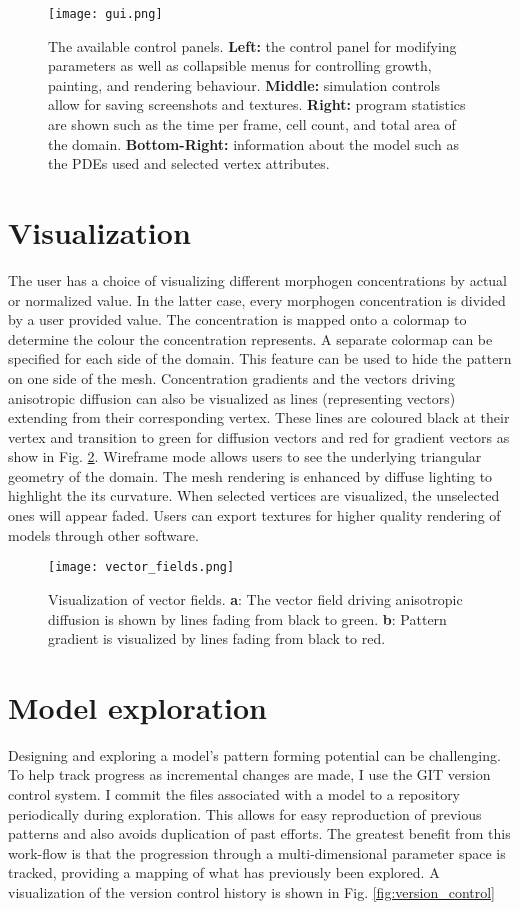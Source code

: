 \begin{figure}[p]
	\centering
	\texttt{[image: gui.png]}	
	\caption{The available control panels. \textbf{Left:} the control panel for modifying parameters as well as collapsible menus for controlling growth, painting, and rendering behaviour. \textbf{Middle:} simulation controls allow for saving screenshots and textures. \textbf{Right:} program statistics are shown such as the time per frame, cell count, and total area of the domain. \textbf{Bottom-Right:} information about the model such as the PDEs used and selected vertex attributes.} 
	\label{fig:GUIexample}
\end{figure}


\section{Visualization}
The user has a choice of visualizing different morphogen concentrations by actual or normalized value. In the latter case, every morphogen concentration is divided by a user provided value. The concentration is mapped onto a colormap to determine the colour the concentration represents. A separate colormap can be specified for each side of the domain. This feature can be used to hide the pattern on one side of the mesh. Concentration gradients and the vectors driving anisotropic diffusion can also be visualized as lines (representing vectors) extending from their corresponding vertex. These lines are coloured black at their vertex and transition to green for diffusion vectors and red for gradient vectors as show in Fig. \ref{fig:vector_fields}. Wireframe mode allows users to see the underlying triangular geometry of the domain. The mesh rendering is enhanced by diffuse lighting to highlight the its curvature. When selected vertices are visualized, the unselected ones will appear faded. Users can export textures for higher quality rendering of models through other software.

\begin{figure}[ht]
	\centering
	\texttt{[image: vector\_fields.png]}	
	\caption{Visualization of vector fields. \textbf{a}: The vector field driving anisotropic diffusion is shown by lines fading from black to green. \textbf{b}: Pattern gradient is visualized by lines fading from black to red.} 
	\label{fig:vector_fields}
\end{figure}

\section{Model exploration}
Designing and exploring a model's pattern forming potential can be challenging. To help track progress as incremental changes are made, I use the GIT version control system. I commit the files associated with a model to a repository periodically during exploration. This allows for easy reproduction of previous patterns and also avoids duplication of past efforts. The greatest benefit from this work-flow is that the progression through a multi-dimensional parameter space is tracked, providing a mapping of what has previously been explored. A visualization of the version control history is shown in Fig. \ref{fig:version_control}

